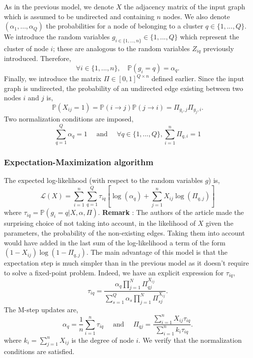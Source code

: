 \documentclass[switch, 12pt]{article}
\newcommand{\intset}[2]{\{#1, ..., #2\}}
\newcommand{\jump}{\newline\newline}
\begin{document}
\begin{multicols}{2}
    As in the previous model, we denote $X$ the adjacency matrix of the input graph which is assumed to be undirected and containing $n$ nodes. We also denote $(\alpha_1, \ldots, \alpha_Q)$ the probabilities for a node of belonging to a cluster $q \in \intset{1}{Q}$. We introduce the random variables $g_{i \in \intset{1}{n}} \in \intset{1}{Q}$ which represent the cluster of node $i$; these are analogous to the random variables $Z_{iq}$ previously introduced. Therefore,
    \begin{equation}
        \forall i \in \intset{1}{n}, \quad \mathbb{P}(g_i = q) = \alpha_q.
    \end{equation}
    Finally, we introduce the matrix $\Pi \in [0, 1]^{Q \times n}$ defined earlier.
    Since the input graph is undirected,
    the probability of an undirected edge existing between two nodes $i$ and $j$ is,
    \begin{equation}
        \mathbb{P}(X_{ij} = 1) = \mathbb{P}(i \rightarrow j) \mathbb{P}(j \rightarrow i) = \Pi_{g_i, j} \Pi_{g_j, i}.
    \end{equation}
    Two normalization conditions are imposed,
    \begin{equation}
        \sum_{q = 1}^Q \alpha_q = 1 \quad \text{ and } \quad \forall q \in \intset{1}{Q}, \sum_{i = 1}^n \Pi_{q, i} = 1
    \end{equation}
    \subsubsection{Expectation-Maximization algorithm}

    The expected log-likelihood (with respect to the random variables $g$) is,
    \begin{equation}
        \mathcal{L}(X) = \sum_{i=1}^n\sum_{q=1}^Q \tau_{iq} \left[ \log(\alpha_q) + \sum_{j=1}^n X_{ij} \log(\Pi_{q, j}) \right]
    \end{equation}
    where $\tau_{iq} = \mathbb{P}(g_i = q | X, \alpha, \Pi)$.
    \newline
    \textbf{Remark} : The authors of the article made the surprising choice of not taking into account, in the likelihood of $X$ given the parameters, the probability of the non-existing edges. Taking them into account would have added in the last sum of the log-likelihood a term of the form $(1 - X_{ij}) \log(1 - \Pi_{q, j})$.
    \jump
    The main advantage of this model is that the expectation step is much simpler than in the previous model as it doesn't require to solve a fixed-point problem. Indeed, we have an explicit expression for $\tau_{iq}$,
    $$ \tau_{iq} = \frac{\alpha_q\prod_{j=1}^N \Pi_{qj}^{X_{ij}}}{\sum_{s=1}^Q \alpha_s\prod_{j=1}^N \Pi_{sj}^{X_{ij}}}.$$
    The M-step updates are,
    $$ \alpha_q = \frac{1}{n} \sum_{i=1}^n \tau_{iq} \quad\text{ and }\quad \Pi_{qj} = \frac{\sum_{i=1}^n X_{ij}\tau_{iq} }{\sum_{i=1}^n k_i \tau_{iq}}.$$
    where $k_i = \sum_{j=1}^n X_{ij}$ is the degree of node $i$. We verify that the normalization conditions are satisfied.


\end{multicols}
\end{document}
